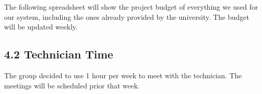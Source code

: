 \documentclass{article}
\begin{document}
The following spreadsheet will show the project budget of everything we used for our system, including the ones already provided by the university. The budget will be updated weekly. 


\subsection{4.2 Technician Time }
The group decided to use 1 hour per week to meet with the technician. The meetings will be scheduled prior that week. 



\end{document}

